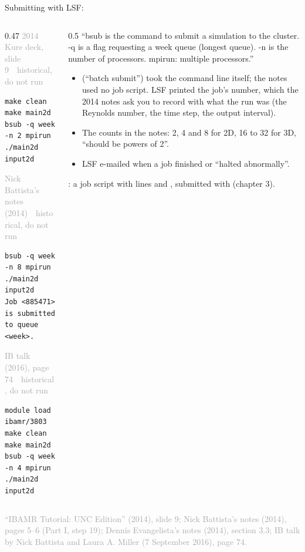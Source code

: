 \documentclass[aspectratio=169,11pt]{beamer}
\newcommand{\sourcecredit}[1]{\vfill\begin{flushright}\tiny\textcolor{DarkGray}{#1}\end{flushright}}
\newcommand{\hist}[1]{{\tiny\sffamily\textcolor{DarkGray}{#1\ \textbullet\ historical, do not run}}\par\nointerlineskip\vspace{0.3mm}}
\begin{document}
\begin{frame}[fragile]{Submitting with LSF: }
\label{fr:bsub}
\begin{columns}[T,onlytextwidth]
\begin{column}{0.47\textwidth}
\hist{2014 Kure deck, slide 9}
\begin{lstlisting}[style=hist]
make clean
make main2d
bsub -q week -n 2 mpirun ./main2d input2d
\end{lstlisting}
\hist{Nick Battista's notes (2014)}
\begin{lstlisting}[style=hist]
bsub -q week -n 8 mpirun ./main2d input2d
Job <885471> is submitted to queue <week>.
\end{lstlisting}
\hist{IB talk (2016), page 74}
\begin{lstlisting}[style=hist]
module load ibamr/3803
make clean
make main2d
bsub -q week -n 4 mpirun ./main2d input2d
\end{lstlisting}
\end{column}
\begin{column}{0.5\textwidth}
\footnotesize ``bsub is the command to submit a simulation to the cluster. -q is a flag requesting a week queue (longest queue). -n is the number of processors. mpirun: multiple processors.''
\begin{itemize}\setlength{\itemsep}{2pt}
  \item {} (``batch submit'') took the command line itself; the notes used no job script. LSF printed the job's number, which the 2014 notes ask you to record with what the run was (the Reynolds number, the time step, the output interval).
  \item The counts in the notes: 2, 4 and 8 for 2D, 16 to 32 for 3D, ``should be powers of 2''.
  \item LSF e-mailed when a job finished or ``halted abnormally''.
\end{itemize}
\vspace{1mm}
: a job script with  lines and , submitted with  (chapter 3).
\end{column}
\end{columns}
\sourcecredit{``IBAMR Tutorial: UNC Edition'' (2014), slide 9; Nick Battista's notes (2014), pages 5--6 (Part I, step 19); Dennis Evangelista's notes (2014), section 3.3; IB talk by Nick Battista and Laura A. Miller (7 September 2016), page 74.}
\end{frame}
\end{document}
